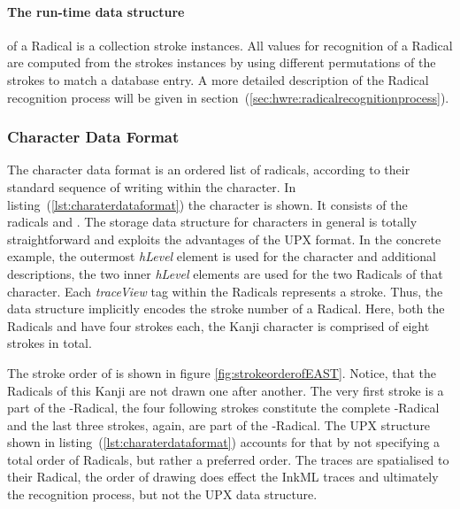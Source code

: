 \paragraph{The run-time data structure} of a Radical is a collection stroke instances.
All values for recognition of a Radical are computed from the strokes instances
by using different permutations of the strokes to match a database entry. A more
detailed description of the Radical recognition process will be given in
section~(\ref{sec:hwre:radicalrecognitionprocess}).

\subsubsection{Character Data Format}
\label{sec:hwre:characterdataformat}

The character data format is an ordered list of radicals, according to their
standard sequence of writing within the character. In 
listing~(\ref{lst:charaterdataformat}) the character  is shown.
It consists of the radicals  and . The storage data structure 
for characters in general is totally straightforward and exploits the 
advantages of the UPX format.
In the concrete example, the outermost \emph{hLevel} element is used for the 
character and additional descriptions, the two inner \emph{hLevel} elements are 
used for the two Radicals of that character. Each \emph{traceView} tag within 
the Radicals represents a stroke. Thus, the data structure implicitly encodes
the stroke number of a Radical. Here, both the Radicals  and 
have four strokes each, the Kanji character  is comprised of 
eight strokes in total.

The stroke order of  is shown in figure \ref{fig:strokeorderofEAST}.
Notice, that the Radicals of this Kanji are not drawn one after another.
The very first stroke is a part of the -Radical, the four following
strokes constitute the complete -Radical and the last three strokes,
again, are part of the -Radical.
The UPX structure shown in listing~(\ref{lst:charaterdataformat}) accounts for
that by not specifying a total order of Radicals, but rather a preferred order.
The traces are spatialised to their Radical, the order of drawing does effect
the InkML traces and ultimately the recognition process, 
but not the UPX data structure.

